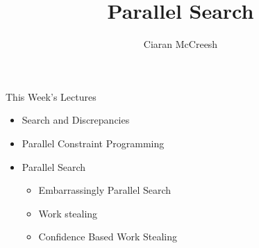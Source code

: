 \documentclass{beamer}
\title{Parallel Search}
\author[Ciaran McCreesh]{\textcolor{uofgblue}{Ciaran McCreesh}}
\begin{document}
{
    \begin{frame}
        \titlepage
    \end{frame}
}

\begin{frame}{This Week's Lectures}
    \begin{itemize}
        \item Search and Discrepancies
        \item Parallel Constraint Programming
        \item \textcolor{uofgblue}{Parallel Search}
            \begin{itemize}
                \item Embarrassingly Parallel Search
                \item Work stealing
                \item Confidence Based Work Stealing
            \end{itemize}
    \end{itemize}
\end{frame}
\end{document}
